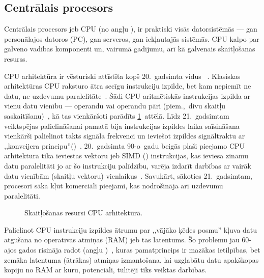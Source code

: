 \subsection{Centrālais procesors} \label{sec:cpu}
Centrālais procesors jeb CPU (no angļu ), ir
praktiski visās datorsistēmās --- gan personālajos datoros (PC), gan serveros,
gan iekļautajās sistēmās. CPU kalpo par galveno vadības komponenti un, vairumā
gadījumu, arī kā galvenais skaitļošanas resurss.

CPU arhitektūra ir vēsturiski attīstīta kopš 20.~gadsimta vidus~%
\cite{Flynn-arch}\cite{von-Neumann}.
Klasiskas arhitektūras CPU raksturo ātra secīgu instrukciju izpilde, 
bet kam nepiemīt ne datu, ne uzdevumu paralelitāte~\cite{Owens-GPU}.
Šādi CPU aritmētiskās instrukcijas izpilda ar vienu datu vienību --- 
operandu vai operandu pāri (piem.,~divu skaitļu saskaitīšanu)~\cite{Flynn-arch},
kā tas vienkāršoti parādīts \ref{fig:cpu-arch}~attēlā.
Līdz 21.~gadsimtam veiktspējas palielināšanai pamatā bija 
instrukcijas izpildes laika saīsināšana vienkārši 
palielinot takts signāla frekvenci
un ieviešot izpildes signāltraktu ar ,,konveijera principu''()~\cite{Flynn-arch}.
20.~gadsimta 90-o~gadu beigās plaši pieejamo CPU arhitektūrā tika ieviestas
vektoru jeb SIMD () 
instrukcijas, kas ieviesa zināmu datu paralelitāti jo ar šo instrukciju
palīdzību, varēja izdarīt darbības ar vairāk datu vienībām (skaitļu vektoru)
vienlaikus~\cite{SIMD}.
Savukārt, sākoties 21.~gadsimtam,  procesori
sāka kļūt komerciāli pieejami, kas nodrošināja arī uzdevumu paralelitāti.

\begin{figure}[tbh]
	\centering
	\def\svgscale{1.2}
	{}
	\caption{Skaitļošanas resursi CPU arhitektūrā.}
	\label{fig:cpu-arch}
\end{figure}

\label{sec:cache}
Palielinot CPU instrukciju izpildes ātrumu par
,,vājāko ķēdes posmu'' kļuva datu atgūšana no operatīvās atmiņas (RAM) jeb
tās latentums.
Šo problēmu jau 60-ajos gados risināja radot
 (angļu )~\cite[473.~lpp.]{Patterson},
kuras pamatprincips ir mazākas ietilpības, bet zemāka latentuma (ātrākas)
atmiņas izmantošana, lai uzglabātu datu apakškopas kopiju no
RAM ar kuru, potenciāli, tūlītēji tiks veiktas darbības.
\cite{Flynn-arch}\cite{Patterson2}\cite{Patterson}\cite{Cache}

